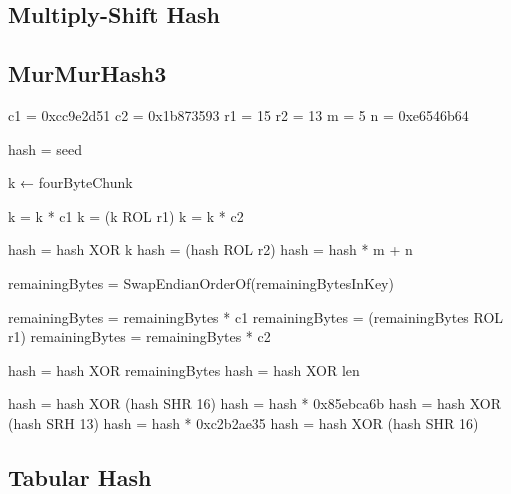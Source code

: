 \documentclass[11pt,oneside,a4paper]{article}
\begin{document}
\begin{appendices}
\subsection{Multiply-Shift Hash}
\begin{algorithm}[H]
\begin{algorithmic}[1]



\EndFunction
\end{algorithmic}


\end{algorithm}



\subsection{MurMurHash3}
\begin{algorithm}[H]
\begin{algorithmic}[1]

    \State c1 = 0xcc9e2d51
    \State c2 = 0x1b873593
    \State r1 = 15
    \State r2 = 13
   \State  m = 5
    \State n = 0xe6546b64

    \State hash  =  seed

         \State  k ← fourByteChunk

          \State k = k * c1
          \State k = (k ROL r1)
          \State k = k * c2

          \State hash = hash XOR k
          \State hash = (hash ROL r2)
          \State hash = hash * m + n
	\EndFor        
	


  \State      remainingBytes = SwapEndianOrderOf(remainingBytesInKey)

         \State  remainingBytes = remainingBytes * c1
          \State remainingBytes = (remainingBytes ROL r1)
          \State remainingBytes = remainingBytes * c2

         \State  hash = hash XOR remainingBytes
\EndFor
      \State hash = hash XOR len

     \State  hash = hash XOR (hash SHR 16)
      \State hash = hash * 0x85ebca6b
      \State hash = hash XOR (hash SRH 13)
      \State hash = hash * 0xc2b2ae35
      \State hash = hash XOR (hash SHR 16)
    \EndFunction
\end{algorithmic}
\end{algorithm}

\subsection{Tabular Hash}
\end{appendices}
\end{document}
